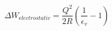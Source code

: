 \begin{equation}
{\Delta}W_{\mathrm electrostatic} = \frac{Q^{2}}{2R} \left ( \frac{1}{\epsilon_{v}} - 1 \right )
\end{equation}
